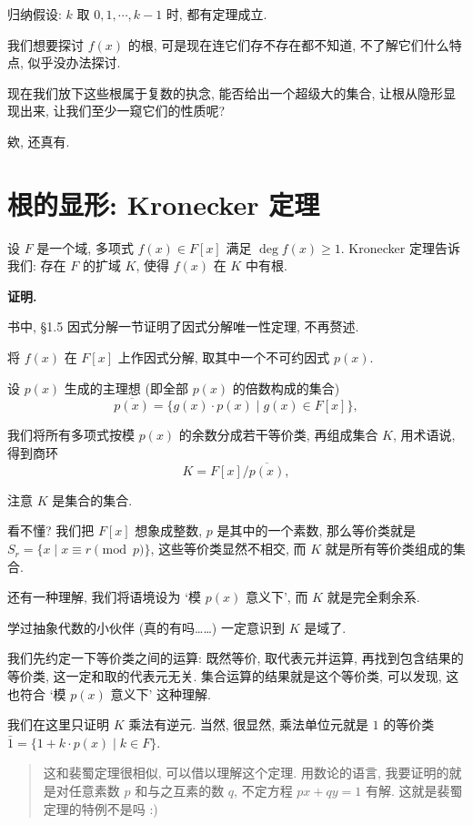 \documentclass[UTF8,a4paper,12pt]{ctexart}
\begin{document}
归纳假设: $k$ 取 $0, 1, \cdots, k-1$ 时, 都有定理成立.

我们想要探讨 $f(x)$ 的根, 可是现在连它们存不存在都不知道, 不了解它们什么特点, 似乎没办法探讨.

现在我们放下这些根属于复数的执念, 能否给出一个超级大的集合, 让根从隐形显现出来, 让我们至少一窥它们的性质呢?

欸, 还真有.

\section{根的显形: Kronecker 定理}

设 $F$ 是一个域, 多项式 $f(x)\in F[x]$ 满足 $\deg f(x)\geq 1$. Kronecker 定理告诉我们: 存在 $F$ 的扩域 $K$, 使得 $f(x)$ 在 $K$ 中有根.

\noindent\textbf{证明.}

书\cite{nkalg}中, \S 1.5 因式分解一节证明了因式分解唯一性定理, 不再赘述.

将 $f(x)$ 在 $F[x]$ 上作因式分解, 取其中一个不可约因式 $p(x)$. 

设 $p(x)$ 生成的主理想 (即全部 $p(x)$ 的倍数构成的集合)
$$
\overline{p(x)}=\{g(x)\cdot p(x)\mid g(x)\in F[x]\},
$$

我们将所有多项式按模 $p(x)$ 的余数分成若干等价类, 再组成集合 $K$, 用术语说, 得到商环
$$
K=F[x]/\overline{p(x)},
$$

注意 $K$ 是集合的集合.

看不懂? 我们把 $F[x]$ 想象成整数, $p$ 是其中的一个素数, 那么等价类就是 $S_r=\{x\mid x\equiv r\pmod{p}\}$, 这些等价类显然不相交, 而 $K$ 就是所有等价类组成的集合.

还有一种理解, 我们将语境设为 `模 $p(x)$ 意义下', 而 $K$ 就是完全剩余系.

学过抽象代数的小伙伴 (真的有吗……) 一定意识到 $K$ 是域了.

我们先约定一下等价类之间的运算: 既然等价, 取代表元并运算, 再找到包含结果的等价类, 这一定和取的代表元无关. 集合运算的结果就是这个等价类, 可以发现, 这也符合 `模 $p(x)$ 意义下' 这种理解.

我们在这里只证明 $K$ 乘法有逆元. 当然, 很显然, 乘法单位元就是 $1$ 的等价类 $\bar{1}=\{1+k\cdot p(x)\mid k\in F\}$.

\begin{quote}
  这和裴蜀定理很相似, 可以借以理解这个定理. 用数论的语言, 我要证明的就是对任意素数 $p$ 和与之互素的数 $q$, 不定方程 $px+qy=1$ 有解. 这就是裴蜀定理的特例不是吗 :)
\end{quote}
\end{document}
